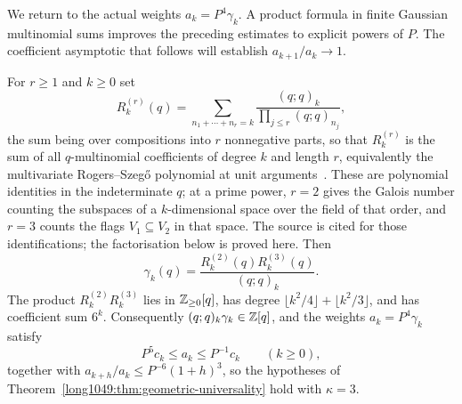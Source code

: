 \documentclass[11pt]{article}
\begin{document}
We return to the actual weights $a_k=P^4\gamma_k$. A product formula
in finite Gaussian multinomial sums improves the preceding estimates
to explicit powers of $P$. The coefficient asymptotic that follows
will establish $a_{k+1}/a_k\to1$.

\begin{proposition}
\label{long1049:prop:rogers-factorisation}
For $r\ge1$ and $k\ge0$ set
\[
 R_k^{(r)}(q)=\sum_{n_1+\cdots+n_r=k}
 \frac{(q;q)_k}{\prod_{j\le r}(q;q)_{n_j}},
\]
the sum being over compositions into $r$ nonnegative parts, so that
$R_k^{(r)}$ is the sum of all $q$-multinomial coefficients of degree $k$ and
length $r$, equivalently the multivariate Rogers--Szeg\H{o} polynomial at unit
arguments~\cite{vinroot2010}. These are polynomial identities in the
indeterminate $q$; at a prime power, $r=2$ gives the Galois number counting
the subspaces of a $k$-dimensional space over the field of that order, and
$r=3$ counts the flags $V_1\subseteq V_2$ in that space. The source is cited
for those identifications; the factorisation below is proved here. Then
\[
 \gamma_k(q)=\frac{R_k^{(2)}(q)R_k^{(3)}(q)}{(q;q)_k}.
\]
The product $R_k^{(2)}R_k^{(3)}$ lies in $\mathbb{Z}_{\ge0}[q]$, has degree
$\lfloor k^2/4\rfloor+\lfloor k^2/3\rfloor$, and has coefficient sum $6^k$.
Consequently $(q;q)_k\gamma_k\in\mathbb{Z}[q]$, and the weights
$a_k=P^4\gamma_k$ satisfy
\[
 P^5c_k\le a_k\le P^{-1}c_k
 \qquad(k\ge0),
\]
together with $a_{k+h}/a_k\le P^{-6}(1+h)^3$, so the hypotheses of
Theorem~\ref{long1049:thm:geometric-universality} hold with $\kappa=3$.
\end{proposition}
\end{document}
